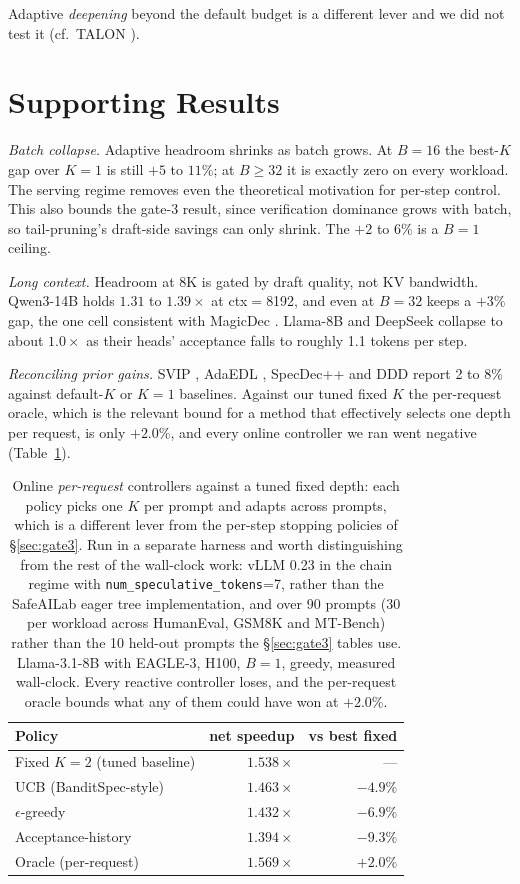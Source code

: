 \documentclass[conference]{IEEEtran}
\begin{document}
Adaptive \emph{deepening} beyond the default budget is a different lever and we did not test
it (cf.\ TALON \cite{talon}).

\section{Supporting Results}
\label{sec:supporting}
\emph{Batch collapse.} Adaptive headroom shrinks as batch grows. At $B{=}16$ the best-$K$ gap
over $K{=}1$ is still $+5$ to $11\%$; at $B{\geq}32$ it is exactly zero on every workload. The
serving regime removes even the theoretical motivation for per-step control. This also bounds
the gate-3 result, since verification dominance grows with batch, so tail-pruning's draft-side
savings can only shrink. The $+2$ to $6\%$ is a $B{=}1$ ceiling.

\emph{Long context.} Headroom at 8K is gated by draft quality, not KV bandwidth. Qwen3-14B
holds $1.31$ to $1.39\times$ at ctx$=$8192, and even at $B{=}32$ keeps a $+3\%$ gap, the one
cell consistent with MagicDec \cite{magicdec}. Llama-8B and DeepSeek collapse to about
$1.0\times$ as their heads' acceptance falls to roughly 1.1 tokens per step.

\emph{Reconciling prior gains.} SVIP \cite{zhang2024svip}, AdaEDL \cite{adaedl}, SpecDec++
\cite{specdec} and DDD \cite{ddd} report 2 to 8\% against
default-$K$ or $K{=}1$ baselines. Against our tuned fixed $K$ the per-request oracle, which
is the relevant bound for a method that effectively selects one depth per request, is only
$+2.0\%$, and every online controller we ran went negative (Table~\ref{tab:bandit}).

\begin{table}[t]
\caption{Online \emph{per-request} controllers against a tuned fixed depth: each policy picks
one $K$ per prompt and adapts across prompts, which is a different lever from the per-step
stopping policies of \S\ref{sec:gate3}. Run in a separate harness and worth distinguishing
from the rest of the wall-clock work: vLLM 0.23 in the chain regime with
\texttt{num\_speculative\_tokens}=7, rather than the SafeAILab eager tree implementation, and
over 90 prompts (30 per workload across HumanEval, GSM8K and MT-Bench) rather than the 10
held-out prompts the \S\ref{sec:gate3} tables use. Llama-3.1-8B with EAGLE-3, H100, $B{=}1$,
greedy, measured wall-clock. Every reactive controller loses, and the per-request oracle
bounds what any of them could have won at $+2.0\%$.}
\label{tab:bandit}
\centering
\small
\begin{tabular}{lrr}
\toprule
Policy & net speedup & vs best fixed \\
\midrule
Fixed $K{=}2$ (tuned baseline) & $1.538\times$ & --- \\
UCB (BanditSpec-style) & $1.463\times$ & $-4.9\%$ \\
$\epsilon$-greedy & $1.432\times$ & $-6.9\%$ \\
Acceptance-history & $1.394\times$ & $-9.3\%$ \\
\midrule
Oracle (per-request) & $1.569\times$ & $+2.0\%$ \\
\bottomrule
\end{tabular}
\end{table}
\end{document}
